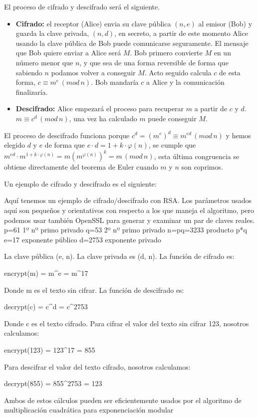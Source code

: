 El proceso de cifrado y descifrado será el siguiente.

\begin{itemize}
	\item \textbf{Cifrado:} el receptor (Alice) envia su clave pública $(n,e)$ al emisor (Bob) y guarda la clave privada, $(n,d)$, en secreto, a partir de este momento Alice usando la clave pública de Bob puede comunicarse seguramente. El mensaje que Bob quiere enviar a Alice será $M$. Bob primero convierte $M$ en un número menor que $n$, y que sea de una forma reversible de forma que sabiendo $n$ podamos volver a conseguir $M$. Acto seguido calcula $c$ de esta forma, $c\equiv m^e\,(mod\,n)$. Bob mandaría $c$ a Alice y la comunicación finalizaría.
	
	\item \textbf{Descifrado:} Alice empezará el proceso para recuperar $m$ a partir de $c$ y $d$. $m\equiv c^d\,(mod\,n)$, una vez ha calculado $m$ puede conseguir $M$.

\end{itemize}

El proceso de descifrado funciona porque $c^d=(m^e)^d\equiv m^{ed}\, (mod\, n)$ y hemos elegido $d$ y $e$ de forma que $e\cdot d =1+k\cdot\varphi(n)$, se cumple que $ m^{ed}\cdot m^{1+k\cdot\varphi(n)} = m(m^{\varphi(n)})^k = m\, (mod\, n)$, esta última congruencia se obtiene directamente del teorema de Euler cuando $m$ y $n$ son coprimos.

Un ejemplo de cifrado y descifrado es el siguiente:



Aquí tenemos un ejemplo de cifrado/descifrado con RSA. Los parámetros usados aquí son pequeños y orientativos con respecto a los que maneja el algoritmo, pero podemos usar también OpenSSL para generar y examinar un par de claves reales.
p=61 	1º nº primo privado
q=53 	2º nº primo privado
n=pq=3233 	producto p*q
e=17 	exponente público
d=2753 	exponente privado

La clave pública (e, n). La clave privada es (d, n). La función de cifrado es:

        \mbox{encrypt}(m) = m^e = m^{17}

Donde m es el texto sin cifrar. La función de descifrado es:

        \mbox{decrypt(c)} = c^d = c^{2753}

Donde c es el texto cifrado. Para cifrar el valor del texto sin cifrar 123, nosotros calculamos:

        \mbox{encrypt(123)} = 123^{17} = 855

Para descifrar el valor del texto cifrado, nosotros calculamos:

        \mbox{decrypt(855)} = 855^{2753} = 123

Ambos de estos cálculos pueden ser eficientemente usados por el algoritmo de multiplicación cuadrática para exponenciación modular


